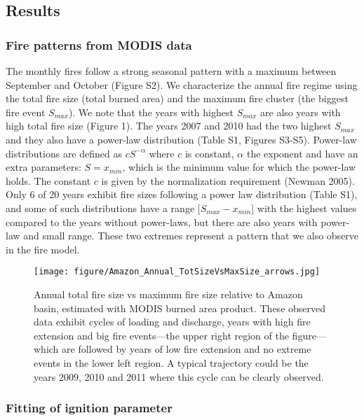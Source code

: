 \documentclass[
]{article}
\begin{document}
\subsection{Results}\label{results}

\subsubsection{Fire patterns from MODIS
data}\label{fire-patterns-from-modis-data}

The monthly fires follow a strong seasonal pattern with a maximum
between September and October (Figure S2). We characterize the annual
fire regime using the total fire size (total burned area) and the
maximum fire cluster (the biggest fire event \(S_{max}\)). We note that
the years with highest \(S_{max}\) are also years with high total fire
size (Figure 1). The years 2007 and 2010 had the two highest \(S_{max}\)
and they also have a power-law distribution (Table S1, Figures S3-S5).
Power-law distributions are defined as \(c S^{-\alpha}\) where \(c\) is
constant, \(\alpha\) the exponent and have an extra parameters:
\(S=x_{min}\), which is the minimum value for which the power-law holds.
The constant \(c\) is given by the normalization requirement (Newman
2005). Only 6 of 20 years exhibit fire sizes following a power law
distribution (Table S1), and some of such distributions have a range
{[}\(S_{max} - x_{min}\){]} with the highest values compared to the
years without power-laws, but there are also years with power-law and
small range. These two extremes represent a pattern that we also observe
in the fire model.

\begin{figure}
\centering
\texttt{[image: figure/Amazon\_Annual\_TotSizeVsMaxSize\_arrows.jpg]}
\caption{Annual total fire size vs maximum fire size relative to Amazon
basin, estimated with MODIS burned area product. These observed data
exhibit cycles of loading and discharge, years with high fire extension
and big fire events---the upper right region of the figure---which are
followed by years of low fire extension and no extreme events in the
lower left region. A typical trajectory could be the years 2009, 2010
and 2011 where this cycle can be clearly observed.}
\end{figure}

\subsubsection{Fitting of ignition
parameter}\label{fitting-of-ignition-parameter}
\end{document}
